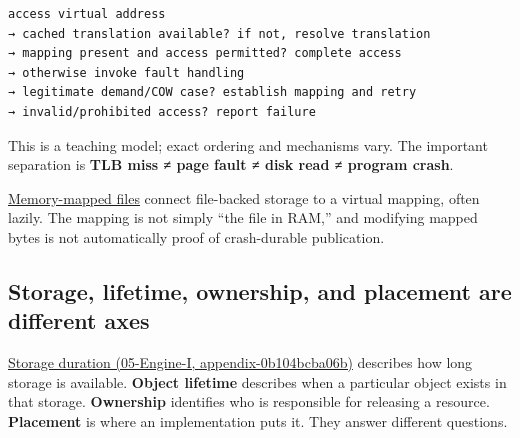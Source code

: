 \begin{verbatim}
access virtual address
→ cached translation available? if not, resolve translation
→ mapping present and access permitted? complete access
→ otherwise invoke fault handling
→ legitimate demand/COW case? establish mapping and retry
→ invalid/prohibited access? report failure
\end{verbatim}

This is a teaching model; exact ordering and mechanisms vary. The important separation is \textbf{TLB miss ≠ page fault ≠ disk read ≠ program crash}.

\hyperref[appendix-313ee7a0ba7b]{Memory-mapped files} connect file-backed storage to a virtual mapping, often lazily. The mapping is not simply ``the file in RAM,'' and modifying mapped bytes is not automatically proof of crash-durable publication.

\subsection{Storage, lifetime, ownership, and placement are different axes}\label{01-foundations-i-ch002-storage-lifetime-ownership-and-placement-are-different-axes}

\href{../05-Engine-I/main.pdf\#nameddest=appendix-0b104bcba06b}{Storage duration (05-Engine-I, appendix-0b104bcba06b)} describes how long storage is available. \textbf{Object lifetime} describes when a particular object exists in that storage. \textbf{Ownership} identifies who is responsible for releasing a resource. \textbf{Placement} is where an implementation puts it. They answer different questions.

